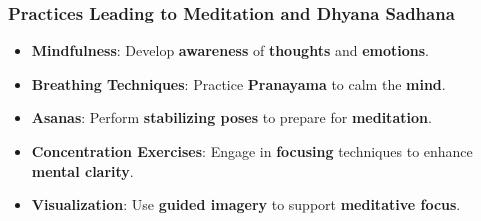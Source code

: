 \begin{frame}[fragile]\frametitle{Practices Leading to Meditation and Dhyana Sadhana}

      \begin{itemize}
        \item \textbf{Mindfulness}: Develop \textbf{awareness} of \textbf{thoughts} and \textbf{emotions}.
        \item \textbf{Breathing Techniques}: Practice \textbf{Pranayama} to calm the \textbf{mind}.
        \item \textbf{Asanas}: Perform \textbf{stabilizing poses} to prepare for \textbf{meditation}.
        \item \textbf{Concentration Exercises}: Engage in \textbf{focusing} techniques to enhance \textbf{mental clarity}.
        \item \textbf{Visualization}: Use \textbf{guided imagery} to support \textbf{meditative focus}.
      \end{itemize}
 
\end{frame}








